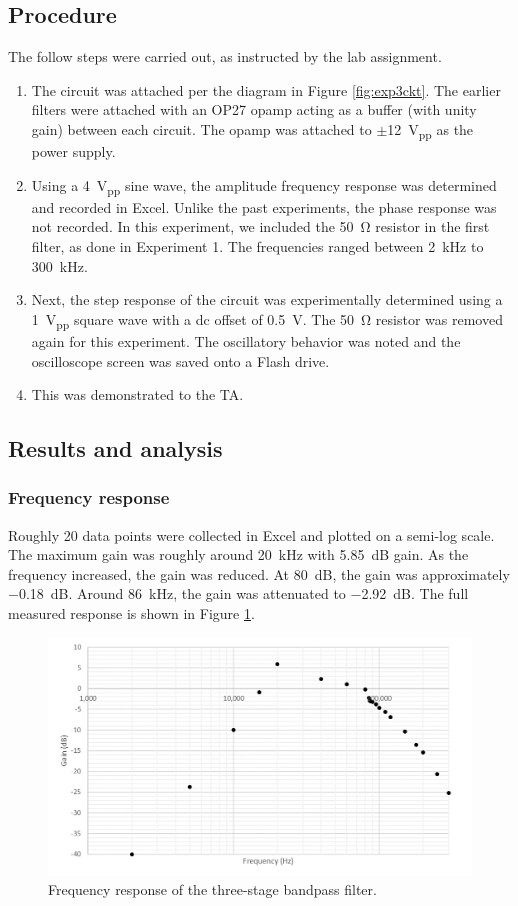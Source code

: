 \documentclass{report}
\newcommand{\pp}{_{pp}}
\newcommand{\Vpp}{\V\pp}
\begin{document}
\subsection{Procedure}
The follow steps were carried out, as instructed by the lab assignment.
\begin{enumerate}
	\item The circuit was attached per the diagram in Figure \ref{fig:exp3ckt}. The earlier filters were attached with an OP27 opamp acting as a buffer (with unity gain) between each circuit. The opamp was attached to $\pm$\SI{12}{\Vpp} as the power supply. 
	\item Using a \SI{4}{\Vpp} sine wave, the amplitude frequency response was determined and recorded in Excel. Unlike the past experiments, the phase response was not recorded. In this experiment, we included the \SI{50}{\ohm} resistor in the first filter, as done in Experiment 1. The frequencies ranged between \SI{2}{\kHz} to \SI{300}{\kHz}.
	\item Next, the step response of the circuit was experimentally determined using a \SI{1}{\Vpp} square wave with a dc offset of \SI{0.5}{\V}. The \SI{50}{\ohm} resistor was removed again for this experiment. The oscillatory behavior was noted and the oscilloscope screen was saved onto a Flash drive.
	\item This was demonstrated to the TA.
\end{enumerate}

\subsection{Results and analysis}

\subsubsection{Frequency response}
Roughly 20 data points were collected in Excel and plotted on a semi-log scale. The maximum gain was roughly around \SI{20}{\kHz} with \SI{5.85}{\dB} gain. As the frequency increased, the gain was reduced. At \SI{80}{\dB}, the gain was approximately \SI{-0.18}{\dB}. Around \SI{86}{\kHz}, the gain was attenuated to \SI{-2.92}{\dB}. The full measured response is shown in Figure \ref{fig:exp3freq}.
\begin{figure}[h]
	\centering
	\includegraphics[width=0.7\linewidth]{exp3freq}
	\caption{Frequency response of the three-stage bandpass filter.}
	\label{fig:exp3freq}
\end{figure}
\pagebreak
\end{document}
